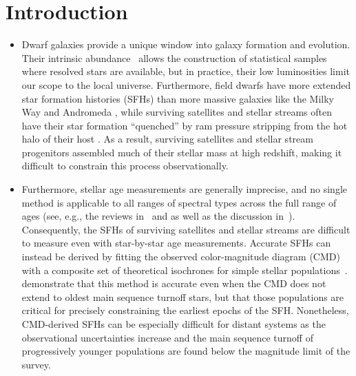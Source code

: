 \documentclass[ms.tex]{subfiles}
\begin{document}
\section{Introduction}
\label{sec:intro}

\begin{itemize}

	\item Dwarf galaxies provide a unique window into galaxy formation and
	evolution.
	Their intrinsic abundance~\citep{Bell2003, Baldry2012} allows the
	construction of statistical samples where resolved stars are available, but
	in practice, their low luminosities limit our scope to the local universe.
	Furthermore, field dwarfs have more extended star formation histories (SFHs)
	than more massive galaxies like the Milky Way and Andromeda
	\citep[e.g.][]{Behroozi2019}, while surviving satellites and stellar
	streams often have their star formation ``quenched'' by ram pressure
	stripping from the hot halo of their host
	\citep*[see discussion in, e.g.,][]{Steyrleithner2020}.
	As a result, surviving satellites and stellar stream progenitors assembled
	much of their stellar mass at high redshift, making it difficult to
	constrain this process observationally.

	\item Furthermore, stellar age measurements are generally imprecise, and no
	single method is applicable to all ranges of spectral types across the full
	range of ages (see, e.g., the reviews in~\citealp{Soderblom2010} and
	\citealp{Chaplin2013} as well as the discussion in~\citealp{Angus2019}).
	Consequently, the SFHs of surviving satellites and stellar streams are
	difficult to measure even with star-by-star age measurements.
	Accurate SFHs can instead be derived by fitting the observed
	color-magnitude diagram (CMD) with a composite set of theoretical
	isochrones for simple stellar populations~\citep[e.g.][]{Dolphin2002}.
	\citet{Weisz2014b} demonstrate that this method is accurate even when the
	CMD does not extend to oldest main sequence turnoff stars, but that those
	populations are critical for precisely constraining the earliest epochs of
	the SFH.
	Nonetheless, CMD-derived SFHs can be especially difficult for distant
	systems as the observational uncertainties increase and the main sequence
	turnoff of progressively younger populations are found below the magnitude
	limit of the survey.


\end{itemize}
\end{document}
